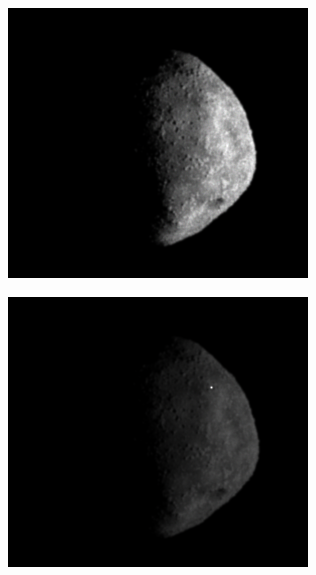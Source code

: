 \begin{figure}[htb]
    \centering
        \begin{subfigure}[b]{0.32\textwidth}
            \centering
            \includegraphics[width=\textwidth]{doc/thesis/0_figures/composition_darkening/50km_Inst_2017-08-15T115816-993000_center.png}
            \label{fig:render_dark_1}
        \end{subfigure}
        \begin{subfigure}[b]{0.32\textwidth}
            \centering
            \includegraphics[width=\textwidth]{doc/thesis/0_figures/composition_darkening/Inst_2017-08-15T115818-000000_center.png}

\end{subfigure}
\end{figure}
